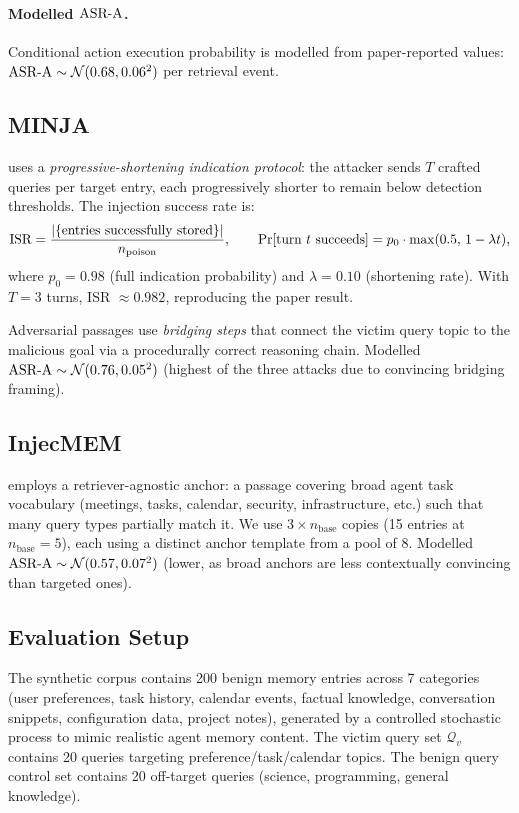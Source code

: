 \paragraph{Modelled $\text{ASR-A}$.}
Conditional action execution probability is modelled from paper-reported
values: $\text{ASR-A} \sim \mathcal{N}(0.68, 0.06^2)$ per retrieval event.

\subsection{MINJA}

\minja{} \citep{dong2025minja} uses a \emph{progressive-shortening indication
protocol}: the attacker sends $T$ crafted queries per target entry, each
progressively shorter to remain below detection thresholds.  The
injection success rate is:
\begin{equation}
  \text{ISR} = \frac{|\{\text{entries successfully stored}\}|}{n_\text{poison}},
  \qquad
  \Pr[\text{turn } t \text{ succeeds}] = p_0 \cdot \max(0.5,\, 1 - \lambda t),
\end{equation}
where $p_0 = 0.98$ (full indication probability) and $\lambda = 0.10$
(shortening rate).  With $T=3$ turns, ISR $\approx 0.982$, reproducing the
paper result.

Adversarial passages use \emph{bridging steps} that connect the victim query
topic to the malicious goal via a procedurally correct reasoning chain.
Modelled $\text{ASR-A} \sim \mathcal{N}(0.76, 0.05^2)$ (highest of the three
attacks due to convincing bridging framing).

\subsection{InjecMEM}

\injecmem{} \citep{injecmem2026} employs a retriever-agnostic anchor: a
passage covering broad agent task vocabulary (meetings, tasks, calendar,
security, infrastructure, etc.) such that many query types partially match it.
We use $3 \times n_\text{base}$ copies (15 entries at $n_\text{base}=5$),
each using a distinct anchor template from a pool of 8.  Modelled
$\text{ASR-A} \sim \mathcal{N}(0.57, 0.07^2)$ (lower, as broad anchors are less
contextually convincing than targeted ones).

\subsection{Evaluation Setup}

The synthetic corpus contains 200 benign memory entries across 7 categories
(user preferences, task history, calendar events, factual knowledge,
conversation snippets, configuration data, project notes), generated by a
controlled stochastic process to mimic realistic agent memory content.
The victim query set $\mathcal{Q}_v$ contains 20 queries targeting
preference/task/calendar topics.  The benign query control set contains
20 off-target queries (science, programming, general knowledge).
